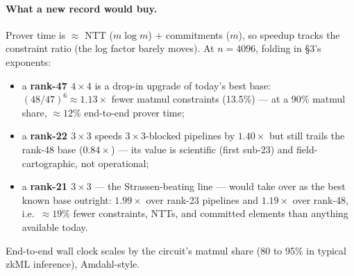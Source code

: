 \documentclass[10pt]{article}
\begin{document}
\paragraph{What a new record would buy.} Prover time is
${\approx}$ NTT ($m\log m$) $+$ commitments ($m$), so speedup
tracks the constraint ratio (the log factor barely moves). At
$n = 4096$, folding in \S3's exponents:
\begin{itemize}
\item a \textbf{rank-47 $4{\times}4$} is a drop-in upgrade of
  today's best base: $(48/47)^6 \approx \mathbf{1.13\times}$
  fewer matmul constraints (13.5\%) --- at a 90\% matmul share,
  ${\approx}12\%$ end-to-end prover time;
\item a \textbf{rank-22 $3{\times}3$} speeds $3{\times}3$-blocked
  pipelines by $\mathbf{1.40\times}$ but still trails the rank-48
  base ($0.84\times$) --- its value is scientific (first sub-23)
  and field-cartographic, not operational;
\item a \textbf{rank-21 $3{\times}3$} --- the Strassen-beating
  line --- would take over as the best known base outright:
  $\mathbf{1.99\times}$ over rank-23 pipelines and
  $\mathbf{1.19\times}$ over rank-48, i.e.\ ${\approx}19\%$
  fewer constraints, NTTs, and committed elements than anything
  available today.
\end{itemize}
End-to-end wall clock scales by the circuit's matmul share
(80 to 95\% in typical zkML inference), Amdahl-style.
\end{document}
